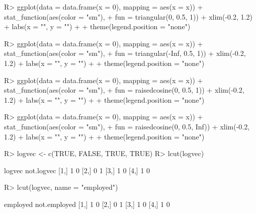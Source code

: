 \documentclass{article}\usepackage[]{graphicx}\usepackage[]{color}
\begin{document}
\begin{Schunk}
\begin{Sinput}
R> ggplot(data = data.frame(x = 0), mapping = aes(x = x)) + stat_function(aes(color = "sm"), 
+      fun = triangular(0, 0.5, 1)) + xlim(-0.2, 1.2) + labs(x = "", y = "") + 
+      theme(legend.position = "none")
\end{Sinput}
\end{Schunk}

\begin{Schunk}
\begin{Sinput}
R> ggplot(data = data.frame(x = 0), mapping = aes(x = x)) + stat_function(aes(color = "sm"), 
+      fun = triangular(-Inf, 0.5, 1)) + xlim(-0.2, 1.2) + labs(x = "", y = "") + 
+      theme(legend.position = "none")
\end{Sinput}
\end{Schunk}

\begin{Schunk}
\begin{Sinput}
R> ggplot(data = data.frame(x = 0), mapping = aes(x = x)) + stat_function(aes(color = "sm"), 
+      fun = raisedcosine(0, 0.5, 1)) + xlim(-0.2, 1.2) + labs(x = "", y = "") + 
+      theme(legend.position = "none")
\end{Sinput}
\end{Schunk}

\begin{Schunk}
\begin{Sinput}
R> ggplot(data = data.frame(x = 0), mapping = aes(x = x)) + stat_function(aes(color = "sm"), 
+      fun = raisedcosine(0, 0.5, Inf)) + xlim(-0.2, 1.2) + labs(x = "", y = "") + 
+      theme(legend.position = "none")
\end{Sinput}
\end{Schunk}

\begin{Schunk}
% --begin: "lcut.logical"
\begin{Sinput}
R> logvec <- c(TRUE, FALSE, TRUE, TRUE)
R> lcut(logvec)
\end{Sinput}
\begin{Soutput}
     logvec not.logvec
[1,]      1          0
[2,]      0          1
[3,]      1          0
[4,]      1          0
\end{Soutput}
\begin{Sinput}
R> lcut(logvec, name = "employed")
\end{Sinput}
\begin{Soutput}
     employed not.employed
[1,]        1            0
[2,]        0            1
[3,]        1            0
[4,]        1            0
\end{Soutput}
%
% --end: "lcut.logical"
\end{Schunk}
\end{document}
